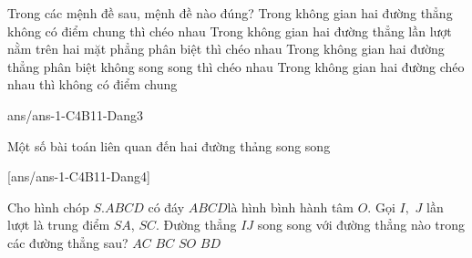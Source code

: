 \begin{ex}%
Trong các mệnh đề sau, mệnh đề nào đúng?
\choice
{Trong không gian hai đường thẳng không có điểm chung thì chéo nhau}
{\True Trong không gian hai đường thẳng lần lượt nằm trên hai mặt phẳng phân biệt thì chéo nhau}
{Trong không gian hai đường thẳng phân biệt không song song thì chéo nhau}
{Trong không gian hai đường chéo nhau thì không có điểm chung}
\end{ex}
\begin{indapan}{10} 
	{ans/ans-1-C4B11-Dang3}
\end{indapan}
\begin{dang}{Một số bài toán liên quan đến hai đường thảng song song}
\end{dang}
[ans/ans-1-C4B11-Dang4]
\begin{ex}%
Cho hình chóp $ S.ABCD$ có đáy $ ABCD$là hình bình hành tâm $ O$. Gọi $ I,$ $ J$ lần lượt là trung điểm $ SA$, $ SC$. Đường thẳng $ IJ$ song song với đường thẳng nào trong các đường thẳng sau?
\choice
{\True $ AC$}
{$ BC$}
{$ SO$}
{$ BD$}
\end{ex}

